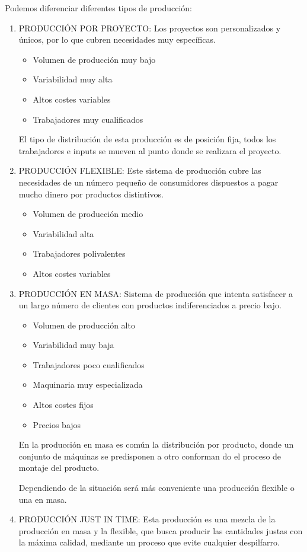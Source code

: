 \documentclass[12pt, twoside, openright]{report} %
\begin{document}
Podemos diferenciar diferentes tipos de producción:
\begin{enumerate}
	\item PRODUCCIÓN POR PROYECTO: Los proyectos son personalizados y únicos, por lo que cubren necesidades muy específicas.
	      \begin{itemize}
		      \item Volumen de producción muy bajo
		      \item Variabilidad muy alta
		      \item Altos costes variables
		      \item Trabajadores muy cualificados
	      \end{itemize}
	      El tipo de distribución de esta producción es de posición fija, todos los trabajadores e inputs se mueven al punto donde se realizara el proyecto.
	\item PRODUCCIÓN FLEXIBLE: Este sistema de producción cubre las necesidades de un número pequeño de consumidores dispuestos a pagar mucho dinero por productos distintivos.
	      \begin{itemize}
		      \item Volumen de producción medio
		      \item Variabilidad alta
		      \item Trabajadores polivalentes
		      \item Altos costes variables
	      \end{itemize}
	      \pagebreak
	\item PRODUCCIÓN EN MASA: Sistema de producción que intenta satisfacer a un largo número de clientes con productos indiferenciados a precio bajo.
	      \begin{itemize}
		      \item Volumen de producción alto
		      \item Variabilidad muy baja
		      \item Trabajadores poco cualificados
		      \item Maquinaria muy especializada
		      \item Altos costes fijos
		      \item Precios bajos
	      \end{itemize}
	      En la producción en masa es común la distribución por producto, donde un conjunto de máquinas se predisponen a otro conforman do el proceso de montaje del producto.

	      Dependiendo de la situación será más conveniente una producción flexible o una en masa.
	\item PRODUCCIÓN JUST IN TIME: Esta producción es una mezcla de la producción en masa y la flexible, que busca producir las cantidades justas con la máxima calidad, mediante un proceso que evite cualquier despilfarro.
\end{enumerate}
\end{document}
